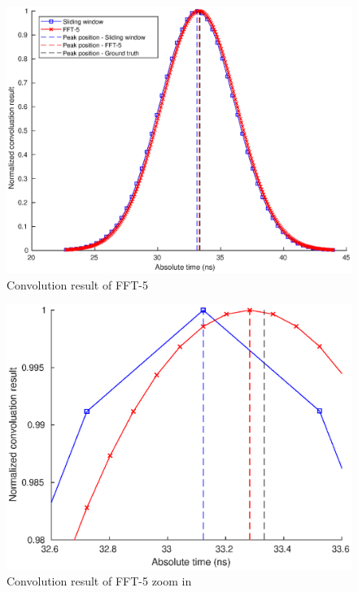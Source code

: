 \begin{figure}[t!p]
\centering
\includegraphics[width=1\textwidth]{figures/chapter_ADC_MF/plot_convRes_FFT5_sim.eps}
\caption{Convolution result of FFT-5}
\label{fig:NP_sig_FFT5}
\end{figure}
%
\begin{figure}[t!p]
\centering
\includegraphics[width=1\textwidth]{figures/chapter_ADC_MF/plot_convRes_FFT5_zoomin.eps}
\caption{Convolution result of FFT-5 zoom in}
\end{figure}
%

